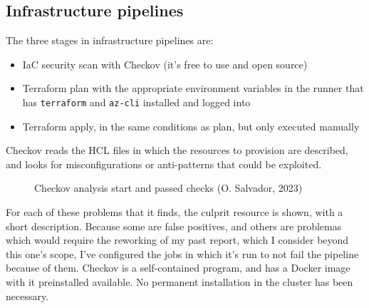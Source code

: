 \documentclass[11pt]{article}
\begin{document}
\begin{flushleft}
    \bigskip
    \bigskip
    \subsection{Infrastructure pipelines}
    The three stages in infrastructure pipelines are:
        \begin{itemize}
            \itemsep0em 
            \item IaC security scan with Checkov (it's free to use and open source)
    
            \item Terraform plan with the appropriate environment variables in the runner that has \texttt{terraform} and \texttt{az-cli} installed and logged into
            
            \item Terraform apply, in the same conditions as plan, but only executed manually    
        \end{itemize}

    Checkov reads the HCL files in which the resources to provision are described, and looks for misconfigurations or anti-patterns that could be exploited.
    
        \begin{figure}[htb]
            \centering
            \caption{Checkov analysis start and passed checks (O. Salvador, 2023)}
        \end{figure}

    For each of these problems that it finds, the culprit resource is shown, with a short description. Because some are false positives, and others are problemas which would require the reworking of my past report, which I consider beyond this one's scope, I've configured the jobs in which it's run to not fail the pipeline because of them. Checkov is a self-contained program, and has a Docker image with it preinstalled available. No permanent installation in the cluster has been necessary.
    \linebreak
    

\end{flushleft}
\end{document}
